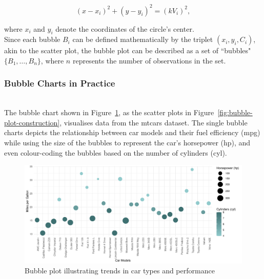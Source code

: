 \documentclass{article}\usepackage[]{graphicx}\usepackage[]{xcolor}
\makeatletter
\def\maxwidth{ %
  \ifdim\Gin@nat@width>\linewidth
    \linewidth
  \else
    \Gin@nat@width
  \fi
}
\newenvironment{knitrout}{}{} %
\numberwithin{equation}{section}
\makeatother
\begin{document}
\[
(x - x_i)^2 + (y - y_i)^2 = (kV_i)^2, 
\]

\noindent where \(x_i\) and \(y_i\) denote the coordinates of the circle's center.\\

\noindent Since each bubble \(B_i\) can be defined mathematically by the triplet \((x_i, y_i, C_i)\), akin to the scatter plot, the bubble plot can be described as a set of ``bubbles" \( \{B_1, \ldots, B_n\}\), where \(n\) represents the number of observations in the set.

\subsubsection{Bubble Charts in Practice}\\

\noindent The bubble chart shown in Figure~\ref{fig:bubble-plot}, as the scatter plots in Figure~\ref{fig:bubble-plot-construction}, visualises data from the mtcars dataset. The single bubble charts depicts the relationship between car models and their fuel efficiency (mpg) while using the size of the bubbles to represent the car's horsepower (hp), and even colour-coding the bubbles based on the number of cylinders (cyl).\\

\begin{knitrout}\scriptsize
{}\color{fgcolor}\begin{figure}[H]

{\centering \includegraphics[width=\maxwidth]{figure/beamer-bubble-plot-1} 

}

\caption[Bubble plot illustrating trends in car types and performance]{Bubble plot illustrating trends in car types and performance}\label{fig:bubble-plot}
\end{figure}

\end{knitrout}
\end{document}
